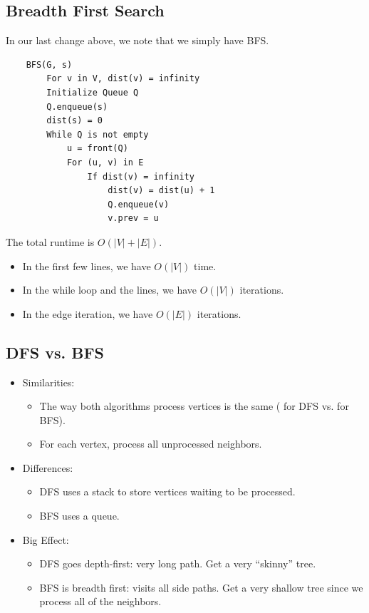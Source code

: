 \documentclass[letterpaper]{article}
\begin{document}
\subsection{Breadth First Search}
In our last change above, we note that we simply have BFS.
\begin{verbatim}
    BFS(G, s)
        For v in V, dist(v) = infinity 
        Initialize Queue Q
        Q.enqueue(s)
        dist(s) = 0
        While Q is not empty
            u = front(Q)
            For (u, v) in E
                If dist(v) = infinity
                    dist(v) = dist(u) + 1
                    Q.enqueue(v)
                    v.prev = u
\end{verbatim}
The total runtime is $O(|V| + |E|)$.
\begin{itemize}
    \item In the first few lines, we have $O(|V|)$ time.
    \item In the while loop and the  lines, we have $O(|V|)$ iterations. 
    \item In the edge iteration, we have $O(|E|)$ iterations. 
\end{itemize}

\subsection{DFS vs. BFS}
\begin{itemize}
    \item Similarities:
    \begin{itemize}
        \item The way both algorithms process vertices is the same ( for DFS vs.  for BFS).
        \item For each vertex, process all unprocessed neighbors.
    \end{itemize}
    \item Differences:
    \begin{itemize}
        \item DFS uses a stack to store vertices waiting to be processed. 
        \item BFS uses a queue.
    \end{itemize}
    \item Big Effect:
    \begin{itemize}
        \item DFS goes depth-first: very long path. Get a very ``skinny'' tree. 
        \item BFS is breadth first: visits all side paths. Get a very shallow tree since we process all of the neighbors.
    \end{itemize}
\end{itemize}
\end{document}
